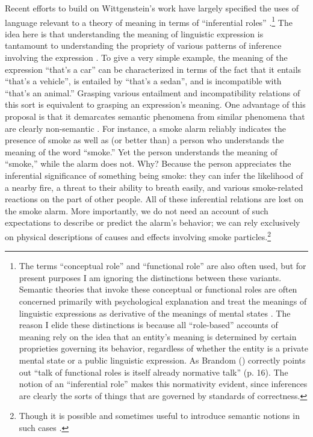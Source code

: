 Recent efforts to build on Wittgenstein's work have largely specified the uses of language relevant to a theory of meaning in terms of ``inferential roles'' \citep{Harman:1982,Brandom:2000,Brandom:1994,Block:1986}.\footnote{The terms ``conceptual role'' and ``functional role'' are also often used, but for present purposes I am ignoring the distinctions between these variants. Semantic theories that invoke these conceptual or functional roles are often concerned primarily with psychological explanation and treat the meanings of linguistic expressions as derivative of the meanings of mental states \citep[e.g.,][]{Harman:1982}. The reason I elide these distinctions is because all ``role-based'' accounts of meaning rely on the idea that an entity's meaning is determined by certain proprieties governing its behavior, regardless of whether the entity is a private mental state or a public linguistic expression. As Brandom (\citeyear{Brandom:1994}) correctly points out ``talk of functional roles is itself already normative talk'' (p. 16). The notion of an ``inferential role'' makes this normativity evident, since inferences are clearly the sorts of things that are governed by standards of correctness.} The idea here is that understanding the meaning of linguistic expression is tantamount to understanding the propriety of various patterns of inference involving the expression \citep{Brandom:1994}. To give a very simple example, the meaning of the expression ``that's a car'' can be characterized in terms of the fact that it entails ``that's a vehicle'', is entailed by ``that's a sedan'', and is incompatible with ``that's an animal.'' Grasping various entailment and incompatibility relations of this sort is equivalent to grasping an expression's meaning. One advantage of this proposal is that it demarcates semantic phenomena from similar phenomena that are clearly non-semantic \citep{Brandom:2000,Brandom:1994,Brandom:2009}. For instance, a smoke alarm reliably indicates the presence of smoke as well as (or better than) a person who understands the meaning of the word ``smoke.'' Yet the person understands the meaning of ``smoke,'' while the alarm does not. Why? Because the person appreciates the inferential significance of something being smoke: they can infer the likelihood of a nearby fire, a threat to their ability to breath easily, and various smoke-related reactions on the part of other people. All of these inferential relations are lost on the smoke alarm. More importantly, we do not need an account of such expectations to describe or predict the alarm's behavior; we can rely exclusively on physical descriptions of causes and effects involving smoke particles.\footnote{Though it is possible and sometimes useful to introduce semantic notions in such cases \citep{Dennett:1987,Hochstein:2011}.}

